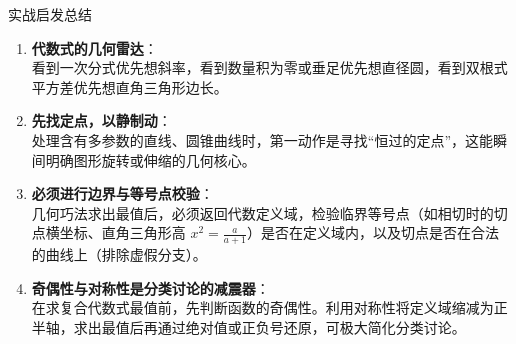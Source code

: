 \documentclass[11pt,a4paper]{ctexart}
\begin{document}
\begin{keybox}{实战启发总结}
\begin{enumerate}[label=\arabic*., leftmargin=2em, itemsep=0.2em]
  \item \textbf{代数式的几何雷达}：\\
        看到一次分式优先想斜率，看到数量积为零或垂足优先想直径圆，看到双根式平方差优先想直角三角形边长。
  \item \textbf{先找定点，以静制动}：\\
        处理含有多参数的直线、圆锥曲线时，第一动作是寻找“恒过的定点”，这能瞬间明确图形旋转或伸缩的几何核心。
  \item \textbf{必须进行边界与等号点校验}：\\
        几何巧法求出最值后，必须返回代数定义域，检验临界等号点（如相切时的切点横坐标、直角三角形高 $x^2 = \frac{a}{a+1}$）是否在定义域内，以及切点是否在合法的曲线上（排除虚假分支）。
  \item \textbf{奇偶性与对称性是分类讨论的减震器}：\\
        在求复合代数式最值前，先判断函数的奇偶性。利用对称性将定义域缩减为正半轴，求出最值后再通过绝对值或正负号还原，可极大简化分类讨论。
\end{enumerate}
\end{keybox}
\end{document}
